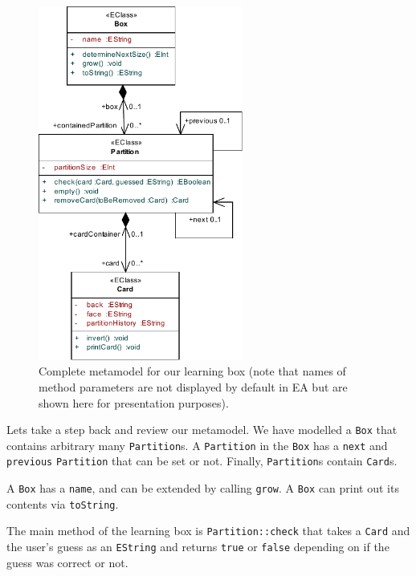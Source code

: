 \begin{figure}[htbp]
	\centering
  \includegraphics[width=0.6\textwidth]{pics/memBoxBilder/memBox44}
	\caption[Complete metamodel for our learning box.]{Complete metamodel for our learning box (note that names of method parameters are not displayed by default in EA but are shown here for presentation purposes).}
	\label{fig:metamodel_complete}
\end{figure}

Lets take a step back and review our metamodel.
We have modelled a \texttt{Box} that contains arbitrary many \texttt{Partition}s.
A \texttt{Partition} in the \texttt{Box} has a \texttt{next} and \texttt{previous} \texttt{Partition} that can be set or not. Finally, \texttt{Partition}s contain \texttt{Card}s.

A \texttt{Box} has a \texttt{name}, and can be extended by calling \texttt{grow}.
A \texttt{Box} can print out its contents via \texttt{toString}.

The main method of the learning box is \texttt{Partition::check} that takes a \texttt{Card} and the user's guess as an \texttt{EString} and returns \texttt{true} or \texttt{false} depending on if the guess was correct or not.

